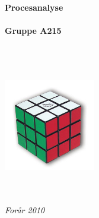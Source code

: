\documentclass[a4paper]{article}
\begin{document}
\thispagestyle{empty}
\begin{center}        %
  \vspace{5mm}          %
  \LARGE
  \textbf{Procesanalyse} \\
  \Large
  \vspace{5mm}
  \textbf{ } \\
  \vspace{5mm}
  \large
  \textbf{Gruppe A215} \\
  \vspace{10mm}
  \Large
  {\bf{\textsl{ }}} \\
   \vspace{2mm}
  {\bf{\textsl{}}} \\
  \vspace{5mm}
  {\large \textsl {}}\\
  
  
  \vspace{10mm}
  \centerline{\includegraphics[width=4cm,height=4cm]{../rapport/input/pics/rubiksCube}}
  \vspace{5mm}
  \textsl{} \\
  \textsl{} \\
  \vspace{10mm}
  \large
  \textsl{For\aa{}r 2010} \\
  \vspace{5mm}
  \normalsize
  \textsl{} \\
  \textsl{} \\
\end{center}

\ \pagebreak{}
\tableofcontents{}
\ \pagebreak{}

\pagebreak

\pagebreak

\pagebreak

\pagebreak

\end{document}
